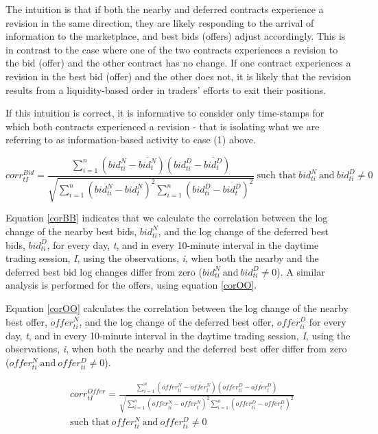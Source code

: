 \documentclass[]{elsarticle} %
\begin{document}
The intuition is that if both the nearby and deferred contracts
experience a revision in the same direction, they are likely responding
to the arrival of information to the marketplace, and best bids (offers)
adjust accordingly. This is in contrast to the case where one of the two
contracts experiences a revision to the bid (offer) and the other
contract has no change. If one contract experiences a revision in the
best bid (offer) and the other does not, it is likely that the revision
results from a liquidity-based order in traders' efforts to exit their
positions.

If this intuition is correct, it is informative to consider only
time-stamps for which both contracts experienced a revision - that is
isolating what we are referring to as information-based activity to case
(1) above.

\begin{equation} \label{corBB} 
corr^{Bid}_{tI} = \frac{\sum\limits_{i=1}^{n} \left(bid_{ti}^N - \overline{bid_t^N}\right) \left(bid_{ti}^D - \overline{bid_t^D}\right)}{\sqrt{\sum\limits_{i=1}^{n} \left(bid_{ti}^N - \overline{bid_t^N}\right)^2 \sum\limits_{i=1}^{n}\left(bid_{ti}^D - \overline{bid_t^D}\right)^2}} \: \textrm{such that} \: bid_{ti}^N \: \textrm{and} \: bid_{ti}^D \neq 0
\end{equation}

Equation \ref{corBB} indicates that we calculate the correlation between
the log change of the nearby best bids, \(bid_{ti}^N\), and the log
change of the deferred best bids, \(bid_{ti}^D\), for every day,
\emph{t}, and in every 10-minute interval in the daytime trading
session, \emph{I}, using the observations, \emph{i}, when both the
nearby and the deferred best bid log changes differ from zero
(\(bid_{ti}^N \: \textrm{and} \: bid_{ti}^D \neq 0\)). A similar
analysis is performed for the offers, using equation \ref{corOO}.

Equation \ref{corOO} calculates the correlation between the log change
of the nearby best offer, \(offer_{ti}^N\), and the log change of the
deferred best offer, \(offer_{ti}^D\) for every day, \emph{t}, and in
every 10-minute interval in the daytime trading session, \emph{I}, using
the observations, \emph{i}, when both the nearby and the deferred best
offer differ from zero
(\({offer_{ti}^N \: \textrm{and} \: offer_{ti}^D} \neq 0\)).

\begin{equation} \label{corOO}
\begin{split}
& corr^{Offer}_{tI} = \frac{\sum\limits_{i=1}^{n} \left(offer_{ti}^N - \overline{offer_t^N}\right) \left(offer_{ti}^D - \overline{offer_t^D}\right)}{\sqrt{\sum\limits_{i=1}^{n} \left(offer_{ti}^N - \overline{offer_t^N}\right)^2 \sum\limits_{i=1}^{n}\left(offer_{ti}^D - \overline{offer_t^D}\right)^2}} \\
& \textrm{such that} \: {offer_{ti}^N \: \textrm{and} \: offer_{ti}^D} \neq 0 
\end{split}
\end{equation}
\end{document}
